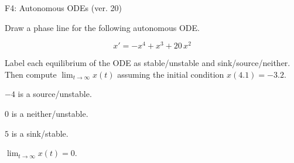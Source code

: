 \begin{exercise}
  \begin{exerciseTitle}F4: Autonomous ODEs (ver. 20)\end{exerciseTitle}
  \begin{exerciseStatement}
    

      Draw a phase line for the following 
      autonomous ODE.
    

    
\[x'= -x^{4} + x^{3} + 20 \, x^{2}\]

    

      Label each equilibrium of the ODE
      as stable/unstable and sink/source/neither.
      Then compute \(\lim_{t\to\infty}x(t)\)
      assuming the initial condition
      \(x( 4.1 )= -3.2\).
    

  \end{exerciseStatement}
  \begin{exerciseAnswer}
    

      \(-4\) is a source/unstable.
      
        \(0\) is a neither/unstable.
      
      \(5\) is a sink/stable.
    

    

      \(\lim_{t\to\infty}x(t)=0\).
    

  \end{exerciseAnswer}
\end{exercise}